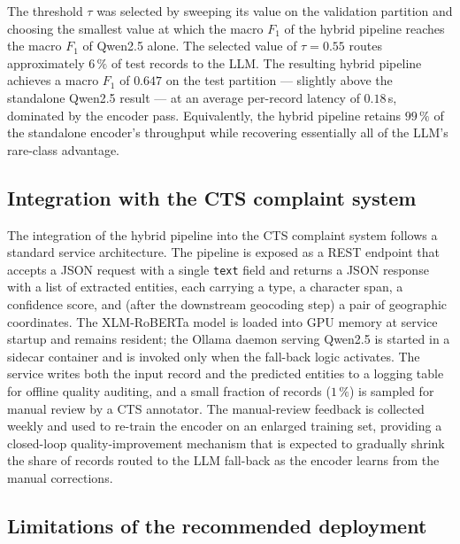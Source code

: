 The threshold $\tau$ was selected by sweeping its value on the validation partition and choosing the smallest value at which the macro $F_1$ of the hybrid pipeline reaches the macro $F_1$ of Qwen2.5 alone. The selected value of $\tau = 0.55$ routes approximately $6\,\%$ of test records to the LLM. The resulting hybrid pipeline achieves a macro $F_1$ of $0.647$ on the test partition --- slightly above the standalone Qwen2.5 result --- at an average per-record latency of $0.18$\,s, dominated by the encoder pass. Equivalently, the hybrid pipeline retains $99\,\%$ of the standalone encoder's throughput while recovering essentially all of the LLM's rare-class advantage.

\subsection{Integration with the CTS complaint system}
\label{sec:cts_integration}

The integration of the hybrid pipeline into the CTS complaint system follows a standard service architecture. The pipeline is exposed as a REST endpoint that accepts a JSON request with a single \texttt{text} field and returns a JSON response with a list of extracted entities, each carrying a type, a character span, a confidence score, and (after the downstream geocoding step) a pair of geographic coordinates. The XLM-RoBERTa model is loaded into GPU memory at service startup and remains resident; the Ollama daemon serving Qwen2.5 is started in a sidecar container and is invoked only when the fall-back logic activates. The service writes both the input record and the predicted entities to a logging table for offline quality auditing, and a small fraction of records ($1\,\%$) is sampled for manual review by a CTS annotator. The manual-review feedback is collected weekly and used to re-train the encoder on an enlarged training set, providing a closed-loop quality-improvement mechanism that is expected to gradually shrink the share of records routed to the LLM fall-back as the encoder learns from the manual corrections.

\subsection{Limitations of the recommended deployment}
\label{sec:deployment_limitations}

